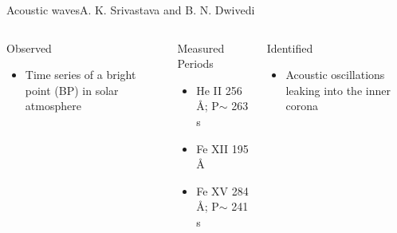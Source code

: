 \documentclass[11pt,table]{beamer}
\begin{document}
\begin{frame}[t]{Acoustic waves}{A. K. Srivastava and B. N. Dwivedi}
    \begin{columns}
        \begin{block}{Observed}
            \begin{itemize}
                \item Time series of a bright point (BP) in solar atmosphere
            \end{itemize}
        \end{block}
        \begin{block}{Measured Periods}
            \begin{itemize}
                \item He {\footnotesize II} 256 \AA{}; P$\sim$ 263 s
                \item Fe {\footnotesize XII} 195 \AA{}
                \item Fe {\footnotesize XV} 284 \AA{}; P$\sim$ 241 s
            \end{itemize}
        \end{block}
        \begin{block}{Identified}
            \begin{itemize}
                \item Acoustic oscillations leaking into the inner corona

\end{itemize}
\end{block}
\end{columns}
\end{frame}
\end{document}
